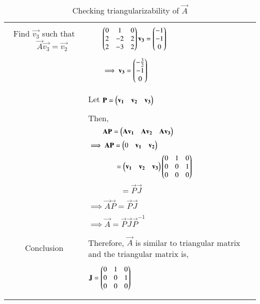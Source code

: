 \documentclass[journal,12pt]{IEEEtran}
\begin{document}
\begin{longtable}{|c|l|}
	&\\
	\hline
	\multirow{3}{*}{Find $\vec{v_3}$ such that $\qquad\vec{A}\vec{v_3}=\vec{v_2}$}&\\ &$\qquad\begin{pmatrix}0&1&0\\2&-2&2\\2&-3&2\end{pmatrix}\mathbf{v_3}=\begin{pmatrix}-1\\-1\\0\end{pmatrix}$\\
	&\\
	& $\qquad\implies \mathbf{v_3}=\begin{pmatrix}-\frac{3}{2}\\-1\\0\end{pmatrix}$\\
	&\\
	\hline
	&\\
	& Let $\Vec{P}=\myvec{\vec{v_1}&\vec{v_2}&\vec{v_3}}$\\
	&\\
	& Then,\\
	& $\qquad\vec{A}\vec{P}=\myvec{\Vec{A}\vec{v_1}&\Vec{A}\vec{v_2}&\Vec{A}\vec{v_3}}$\\
	& $\implies \mathbf{A}\mathbf{P}=\begin{pmatrix}0&\mathbf{v_1}&\mathbf{v_2}\end{pmatrix}$\\
	&$\qquad\qquad = \begin{pmatrix}\mathbf{v_1}&\mathbf{v_2}&\mathbf{v_3}\end{pmatrix}\begin{pmatrix}0&1&0\\0&0&1\\0&0&0\end{pmatrix}$\\
	&$\qquad\qquad=\vec{P}\vec{J}$\\
	&\\
	&$\implies \vec{A}\vec{P}=\vec{P}\vec{J}$\\
	&\\
	&$\implies \vec{A}=\vec{P}\vec{J}\vec{P}^{-1}$\\
	&\\
	\hline
	\multirow{3}{*}{Conclusion} & \\
	& Therefore, $\vec{A}$ is similar to triangular matrix and the triangular matrix is,\\
	&\\
	&$\mathbf{J}=\begin{pmatrix}0&1&0\\0&0&1\\0&0&0\end{pmatrix}$\\
	&\\
	\hline
	\caption{Checking triangularizability of $\vec{A}$}
    \label{table:2}
\end{longtable}
\end{document}
